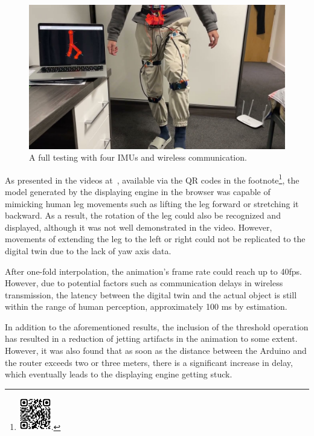 \begin{figure}[htbp]
	\centering
	\includegraphics[width=1\textwidth]{
		fileForWriting/youtube-page}
	\caption[A full testing with four IMUs and wireless communication]{A full testing with four IMUs and wireless communication.}
	\label{fig:youtube-demo}
\end{figure}


As presented in the videos at~\cite{youtube-demo},
available via the QR codes in the
footnote\footnote{\includegraphics[width=1.4cm]{fileForWriting/qrcode-youtube}\cite{youtube-demo}.},
the model generated by the displaying engine in the browser was capable of mimicking human leg movements such as lifting the leg forward or stretching it backward.
As a result, the rotation of the leg could also be recognized and displayed, although it was not well demonstrated in the video.
However, movements of extending the leg to the left or right could not be replicated to the digital twin due to the lack of yaw axis data.

After one-fold interpolation, the animation's frame rate could reach up to 40fps.
However, due to potential factors such as communication delays in wireless transmission, the latency between the digital twin and the actual object is still within the range of human perception, approximately 100 ms by estimation.

In addition to the aforementioned results, the inclusion of the threshold operation has resulted in a reduction of jetting artifacts in the animation to some extent.
However, it was also found that as soon as the distance between the Arduino and the router exceeds two or three meters, there is a significant increase in delay, which eventually leads to the displaying engine getting stuck.


